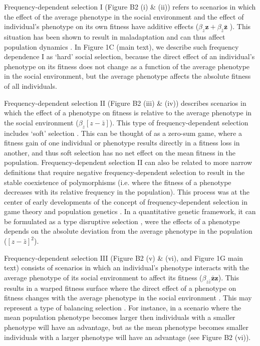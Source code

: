 \documentclass{article}
\begin{document}
	Frequency-dependent selection I (Figure B2 (i) \& (ii)) refers to scenarios in which the effect of the average phenotype in the social environment and the effect of individual's phenotype on its own fitness have additive effects ($\beta_z \mathbf{z} + \beta_{\bar{z}} \mathbf{\bar{z}}$ ). This situation has been shown to result in maladaptation \citep{Lande1976} and can thus affect population dynamics \citep{Lande2007}. In Figure 1C (main text), we describe such frequency dependence I as `hard' social selection, because the direct effect of an individual's phenotype on its fitness does not change as a function of the average phenotype in the social environment, but the average phenotype affects the absolute fitness of all individuals. 
	
	Frequency-dependent selection II (Figure B2 (iii) \& (iv)) describes scenarios in which the effect of a phenotype on fitness is relative to the average phenotype in the social environment ($\beta_z [z-\bar{z}]$). This type of frequency-dependent selection includes `soft' selection \citep{Wallace1975, Bell2021}. This can be thought of as a zero-sum game, where a fitness gain of one individual or phenotype results directly in a fitness loss in another, and thus soft selection has no net effect on the mean fitness in the population. Frequency-dependent selection II can also be related to more narrow definitions that require negative frequency-dependent selection to result in the stable coexistence of polymorphisms (i.e. where the fitness of a phenotype decreases with its relative frequency in the population). This process was at the center of early developments of the concept of frequency-dependent selection in game theory and population genetics \citep{MaynardSmith1982, McGill2007, Gromko1977, Ayala1974, Heino1998}. In a quantitative genetic framework, it can be formulated as a type disruptive selection \citep{Burger2004}, were the effects of a phenotype depends on the absolute deviation from the average phenotype in the population ($[z-\bar{z}]^2$). 
	
	Frequency-dependent selection III (Figure B2 (v) \& (vi), and Figure 1G main text) consists of scenarios in which an individual's phenotype interacts with the average phenotype of its social environment to affect its fitness ($\beta_{z\bar{z}} \mathbf{\bar{z}z}$). This results in a warped fitness surface where the direct effect of a phenotype on fitness changes with the average phenotype in the social environment \citep{Araya-Ajoy2020}. This may represent a type of balancing selection \citep{Gromko1977}. For instance, in a scenario where the mean population phenotype becomes larger then individuals with a smaller phenotype will have an advantage, but as the mean phenotype becomes smaller individuals with a larger phenotype will have an advantage (see Figure B2 (vi)).
	
\end{document}
